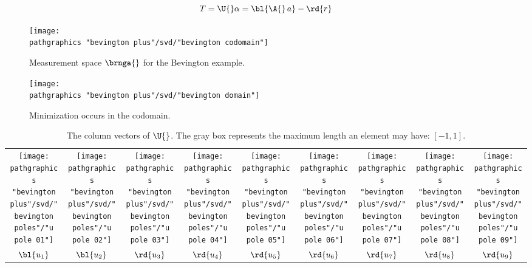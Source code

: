   \begin{equation*}
        T = \U{} \alpha = \bl{\A{}\,a} - \rd{r}
  \end{equation*}
\begin{figure}[t]
	\texttt{[image: \\pathgraphics "bevington plus"/svd/"bevington codomain"]}
	\caption[Measurement space for the Bevington example]{Measurement space $\brnga{}$ for the Bevington example.}
	\label{fig:bevington codomain}
\end{figure}
%
\begin{figure}[t]
	\texttt{[image: \\pathgraphics "bevington plus"/svd/"bevington domain"]}
	\caption{Minimization occurs in the codomain.}
	\label{fig:bevington codomain with data}
\end{figure}

\begin{table}[t]
	\begin{center}
		\begin{tabular}{ccccccccc}
			\texttt{[image: \\pathgraphics "bevington plus"/svd/"bevington poles"/"u pole 01"]} &
			\texttt{[image: \\pathgraphics "bevington plus"/svd/"bevington poles"/"u pole 02"]} &
			\texttt{[image: \\pathgraphics "bevington plus"/svd/"bevington poles"/"u pole 03"]} &
			\texttt{[image: \\pathgraphics "bevington plus"/svd/"bevington poles"/"u pole 04"]} &
			\texttt{[image: \\pathgraphics "bevington plus"/svd/"bevington poles"/"u pole 05"]} &
			\texttt{[image: \\pathgraphics "bevington plus"/svd/"bevington poles"/"u pole 06"]} &
			\texttt{[image: \\pathgraphics "bevington plus"/svd/"bevington poles"/"u pole 07"]} &
			\texttt{[image: \\pathgraphics "bevington plus"/svd/"bevington poles"/"u pole 08"]} &
			\texttt{[image: \\pathgraphics "bevington plus"/svd/"bevington poles"/"u pole 09"]} \\
		  $\bl{u_{1}}$ & $\bl{u_{2}}$ & $\rd{u_{3}}$ & $\rd{u_{4}}$ & $\rd{u_{5}}$ & $\rd{u_{6}}$ & $\rd{u_{7}}$ & $\rd{u_{8}}$ & $\rd{u_{9}}$
		\end{tabular}
	\end{center}
	\label{tab:bevington poles}
	\caption[The column vectors of $\U{}$.]{The column vectors of $\U{}$. The gray box represents the maximum length an element may have: $[-1,1]$.}
\end{table}%

